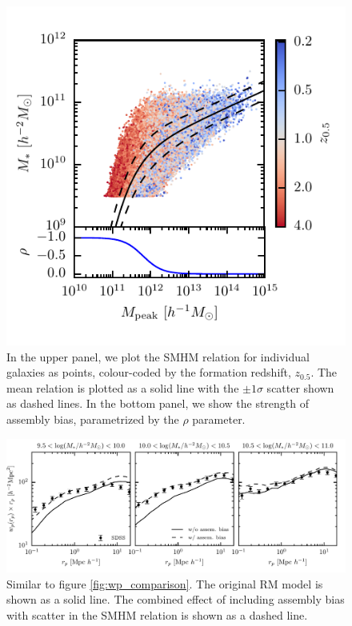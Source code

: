 \documentclass[a4paper,fleqn,usenatbib]{mnras}
\begin{document}
\begin{figure}
    \includegraphics{figures/smhm_assem_bias.pdf}
    \caption{In the upper panel, we plot the SMHM relation for individual galaxies as points, colour-coded by the formation redshift, $z_{0.5}$.  The mean relation is plotted as a solid line with the $\pm 1\sigma$ scatter shown as dashed lines.  In the bottom panel, we show the strength of assembly bias, parametrized by the $\rho$ parameter.}
    \label{fig:assem_bias_smhm}
\end{figure} 

\begin{figure}
    \includegraphics{figures/wp_comparison_assem_bias.pdf}
    \caption{Similar to figure \ref{fig:wp_comparison}.  The original RM model is shown as a solid line.  The combined effect of including assembly bias with scatter in the SMHM relation is shown as a dashed line.}
    \label{fig:wp_comparison_assem_bias}
\end{figure}
\end{document}
